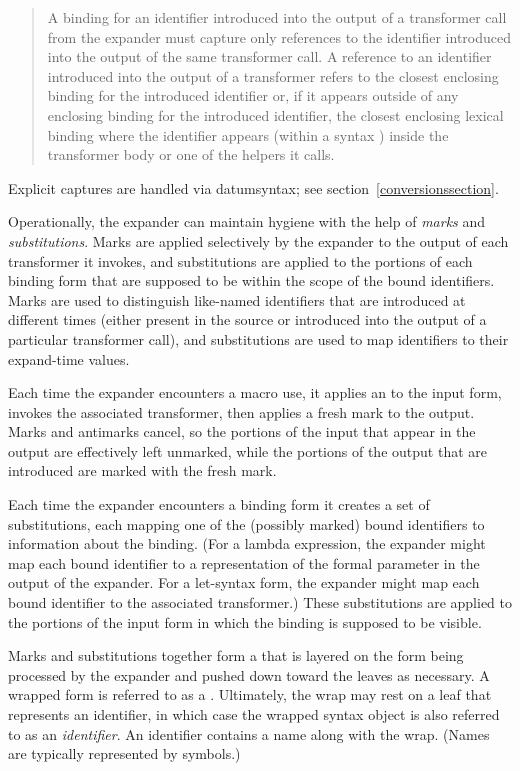 \begin{quotation}
\noindent
A binding for an identifier introduced into the output of a transformer
call from the expander must capture only references to the identifier
introduced into the output of the same transformer call.
A reference to an identifier introduced into the output of a transformer
refers to the closest enclosing binding for the introduced identifier or,
if it appears outside of any enclosing binding for the introduced
identifier, the closest enclosing lexical binding where the identifier
appears (within a {\cf syntax} )
inside the transformer body or one of the helpers it calls.
\end{quotation}

Explicit captures are handled via {\cf datum\coerce{}syntax}; see
section~\ref{conversionssection}.

Operationally, the expander can maintain hygiene with the help of
\emph{marks} and \emph{substitutions}.
Marks are applied selectively by the expander to the output of each
transformer it invokes, and substitutions are applied to the portions
of each binding form that are supposed to be within the scope of the bound
identifiers.
Marks are used to distinguish like-named identifiers that are
introduced at different times (either present in the source or introduced
into the output of a particular transformer call), and substitutions are
used to map identifiers to their expand-time values.

Each time the expander encounters a macro use, it applies an
 to the input form, invokes the associated transformer,
then applies a fresh mark to the output.
Marks and antimarks cancel, so the portions of the input that appear in
the output are effectively left unmarked, while the portions of the output
that are introduced are marked with the fresh mark.

Each time the expander encounters a binding form it creates a set of
substitutions, each mapping one of the (possibly marked) bound identifiers
to information about the binding.
(For a {\cf lambda} expression, the expander might map each bound
identifier to a representation of the formal parameter in the output of
the expander.
For a {\cf let-syntax} form, the expander might map each bound
identifier to the associated transformer.)
These substitutions are applied to the portions of the input form in
which the binding is supposed to be visible.

Marks and substitutions together form a  that is layered on the
form being processed by the expander and pushed down toward the leaves as
necessary.
A wrapped form is referred to as a .
Ultimately, the wrap may rest on a leaf that represents an identifier, in
which case the wrapped syntax object is also referred to
as an \emph{identifier}.
An identifier contains a name along with the wrap.
(Names are typically represented by symbols.)


